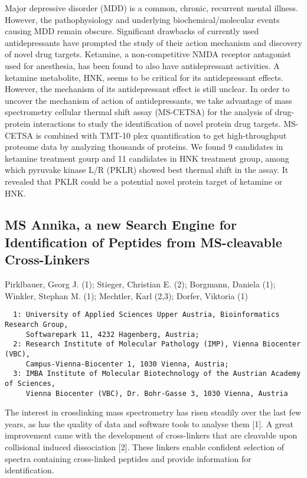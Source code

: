 {Major depressive disorder (MDD) is a common, chronic, recurrent mental illness. However, the pathophysiology and underlying biochemical/molecular events causing MDD remain obscure. Significant drawbacks of currently used antidepressants have prompted the study of their action mechanism and discovery of novel drug targets. Ketamine, a non-competitive NMDA receptor antagonist used for anesthesia, has been found to also have antidepressant activities. A ketamine metabolite, HNK, seems to be critical for its antidepressant effects. However, the mechanism of its antidepressant effect is still unclear. In order to uncover the mechanism of action of antidepressants, we take advantage of mass spectrometry cellular thermal shift assay (MS-CETSA) for the analysis of drug-protein interactions to study the identification of novel protein drug targets. MS-CETSA is combined with TMT-10 plex quantification to get high-throughput proteome data by analyzing thousands of proteins. We found 9 candidates in ketamine treatment gourp and 11 candidates in HNK treatment group, among which pyruvake kinase L/R (PKLR) showed best thermal shift in the assay. It revealed that PKLR could be a potential novel protein target of ketamine or HNK.


\subsection*{\color{eubicRed} MS Annika, a new Search Engine for Identification of Peptides from MS-cleavable Cross-Linkers}
{\color{eubicGray}Pirklbauer, Georg J. (1);
Stieger, Christian E. (2);
Borgmann, Daniela (1);
Winkler, Stephan M. (1);
Mechtler, Karl (2,3);
Dorfer, Viktoria (1)}
{\color{eubicGray}\begin{verbatim}
  1: University of Applied Sciences Upper Austria, Bioinformatics Research Group,
     Softwarepark 11, 4232 Hagenberg, Austria;
  2: Research Institute of Molecular Pathology (IMP), Vienna Biocenter (VBC),
     Campus-Vienna-Biocenter 1, 1030 Vienna, Austria;
  3: IMBA Institute of Molecular Biotechnology of the Austrian Academy of Sciences,
     Vienna Biocenter (VBC), Dr. Bohr-Gasse 3, 1030 Vienna, Austria
\end{verbatim}}

The interest in crosslinking mass spectrometry has risen steadily over the last few years, as has the quality of data and software tools to analyse them [1]. A great improvement came with the development of cross-linkers that are cleavable upon collisional induced dissociation [2]. These linkers enable confident selection of spectra containing cross-linked peptides and provide information for identification.

}
